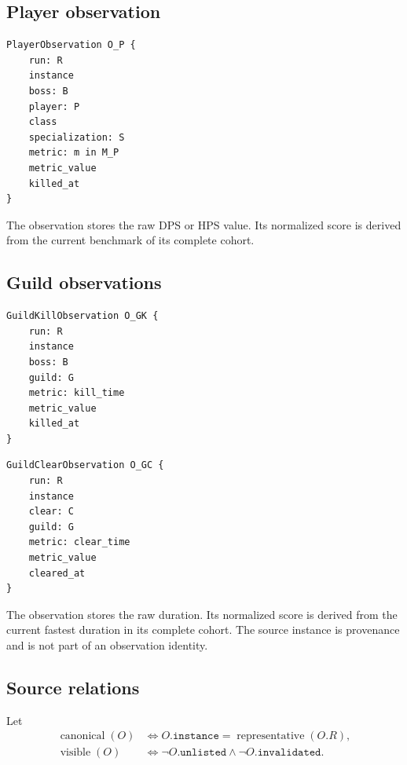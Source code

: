 \documentclass[11pt]{article}
\newcommand{\field}[1]{\texttt{#1}}
\begin{document}
\subsection{Player observation}
\begin{verbatim}
PlayerObservation O_P {
    run: R
    instance
    boss: B
    player: P
    class
    specialization: S
    metric: m in M_P
    metric_value
    killed_at
}
\end{verbatim}

The observation stores the raw DPS or HPS value. Its normalized score is derived from the current benchmark of its complete cohort.

\subsection{Guild observations}
\noindent
\begin{minipage}[t]{0.48\linewidth}
\small
\begin{verbatim}
GuildKillObservation O_GK {
    run: R
    instance
    boss: B
    guild: G
    metric: kill_time
    metric_value
    killed_at
}
\end{verbatim}
\end{minipage}
\hfill
\begin{minipage}[t]{0.48\linewidth}
\small
\begin{verbatim}
GuildClearObservation O_GC {
    run: R
    instance
    clear: C
    guild: G
    metric: clear_time
    metric_value
    cleared_at
}
\end{verbatim}
\end{minipage}

The observation stores the raw duration. Its normalized score is derived from the current fastest duration in its complete cohort. The source instance is provenance and is not part of an observation identity.

\subsection{Source relations}
Let
\[
\begin{aligned}
\operatorname{canonical}(O)
  &\Longleftrightarrow O.\field{instance}=\operatorname{representative}(O.R),\\
\operatorname{visible}(O)
  &\Longleftrightarrow \neg O.\field{unlisted}\land\neg O.\field{invalidated}.
\end{aligned}
\]
\end{document}
